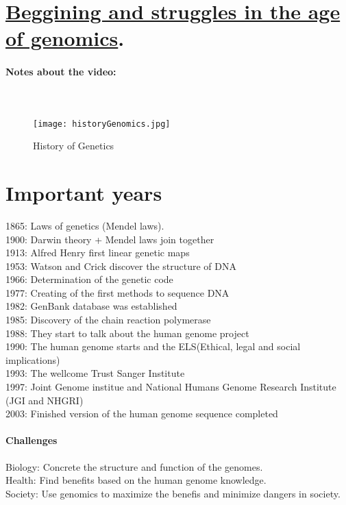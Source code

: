 
\section{\href{https://www.youtube.com/watch?v=hS47TcdiKUU}{Beggining and struggles in the age of genomics}.}

\paragraph{Notes about the video:}

\paragraph{\\}
\begin{figure}[htbp]
    \centerline{\texttt{[image: historyGenomics.jpg]}}
    \caption{History of Genetics}
    \label{fig4}
\end{figure}

\section{Important years}
1865: Laws of genetics (Mendel laws). \\
1900: Darwin theory + Mendel laws join together \\
1913: Alfred Henry first linear genetic maps \\
1953: Watson and Crick discover the structure of DNA \\
1966: Determination of the genetic code \\
1977: Creating of the first methods to sequence DNA \\
1982: GenBank database was established \\ 
1985: Discovery of the chain reaction polymerase \\
1988: They start to talk about the human genome project \\
1990: The human genome starts and the ELS(Ethical, legal and social implications) \\
1993: The wellcome Trust Sanger Institute \\
1997: Joint Genome institue and National Humans Genome Research Institute (JGI and NHGRI)\\
2003: Finished version of the human genome sequence completed \\

\paragraph{Challenges}
Biology: Concrete the structure and function of the genomes. \\
Health: Find benefits based on the human genome knowledge. \\
Society: Use genomics to maximize the benefis and minimize dangers in society. \\


